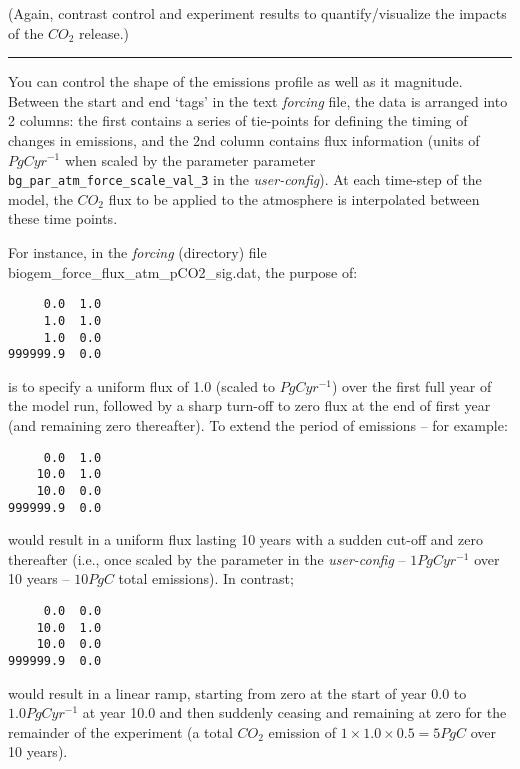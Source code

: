 \documentclass[11pt,fleqn]{book} %
\begin{document}
\noindent (Again, contrast control and experiment results to quantify/visualize the impacts of the \(CO_{2}\) release.)

\vspace{1mm}
\noindent\rule{4cm}{0.1mm}
\vspace{2mm}

\noindent You can control the shape of the emissions profile as well as it magnitude. Between the start and end ‘tags’ in the text \textit{forcing} file, the data is arranged into 2 columns: the first contains a series of tie-points for defining the timing of changes in emissions, and the 2nd column contains flux information (units of \(PgC yr^{-1}\) when scaled by the parameter parameter \texttt{bg\_par\_atm\_force\_scale\_val\_3} in the \textit{user-config}). At each time-step of the model, the \(CO_{2}\) flux to be applied to the atmosphere is interpolated between these time points.

\pagebreak

For instance, in the \textit{forcing} (directory) file \footnotesize\textsf{biogem\_force\_flux\_atm\_pCO2\_sig.dat}\normalsize, the purpose of: 
\vspace{-2pt}\begin{verbatim}
     0.0  1.0 
     1.0  1.0
     1.0  0.0
999999.9  0.0
\end{verbatim}\vspace{-2pt}
is to specify a uniform flux of 1.0 (scaled to \(PgC yr^{-1}\)) over the first full year of the model run, followed by a sharp turn-off to zero flux at the end of first year (and remaining zero thereafter). To extend the period of emissions – for example: 
\vspace{-2pt}\begin{verbatim}
     0.0  1.0 
    10.0  1.0
    10.0  0.0
999999.9  0.0
\end{verbatim}\vspace{-2pt}
would result in a uniform flux lasting 10 years with a sudden cut-off and zero thereafter (i.e., once scaled by the parameter in the \textit{user-config} – \(1 PgC yr^{-1}\) over 10 years – \(10 PgC\) total emissions). In contrast; \vspace{-2pt}\begin{verbatim}
     0.0  0.0
    10.0  1.0
    10.0  0.0
999999.9  0.0
\end{verbatim}\vspace{-2pt}
would result in a linear ramp, starting from zero at the start of year \(0.0\) to \(1.0 PgC yr^{-1}\) at year 10.0 and then suddenly ceasing and remaining at zero for the remainder of the experiment (a total \(CO_{2}\) emission of \(1\times1.0\times0.5 = 5PgC\) over 10 years).
\end{document}
